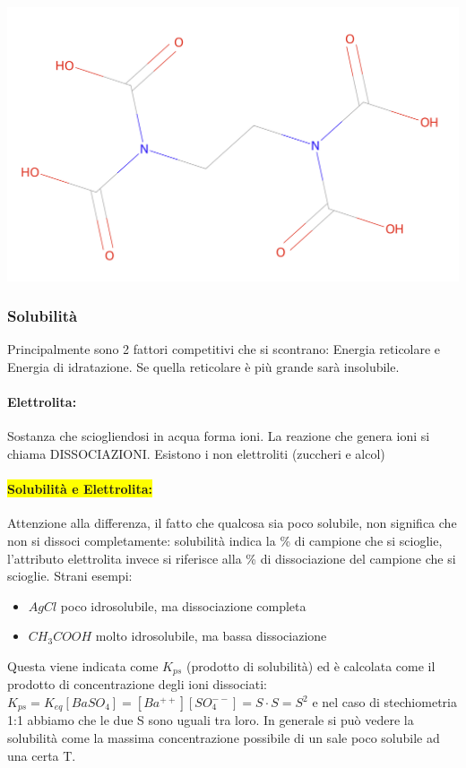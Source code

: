 \documentclass{article}
\begin{document}
\begin{center}
	\includegraphics*[width=0.9\linewidth]{../images/EDTA.png}
\end{center}

\subsubsection{Solubilità}Principalmente sono 2 fattori competitivi che si scontrano: Energia reticolare e Energia di idratazione. Se quella reticolare è più grande sarà insolubile.
\paragraph{Elettrolita:} Sostanza che sciogliendosi in acqua forma ioni. La reazione che genera ioni si chiama DISSOCIAZIONI. Esistono i non elettroliti (zuccheri e alcol)
\paragraph{\colorbox{yellow}{Solubilità e Elettrolita:}} Attenzione alla differenza, il fatto che qualcosa sia poco solubile, non significa che non si dissoci completamente: solubilità indica la \% di campione che si scioglie, l'attributo elettrolita invece si riferisce alla \% di dissociazione del campione che si scioglie. Strani esempi:
\begin{itemize}
	\item $AgCl$ poco idrosolubile, ma dissociazione completa 
	\item $CH_3COOH$ molto idrosolubile, ma bassa dissociazione
\end{itemize}
Questa viene indicata come $K_{ps}$ (prodotto di solubilità) ed è calcolata come il prodotto di concentrazione degli ioni dissociati: $K_{ps} = K_{eq} [BaSO_4] = [Ba^{++}][SO_4^{--}] = S \cdot S = S^2$ e nel caso di stechiometria 1:1 abbiamo che le due S sono uguali tra loro.
In generale si può vedere la solubilità come la massima concentrazione possibile di un sale poco solubile ad una certa T.
\end{document}
